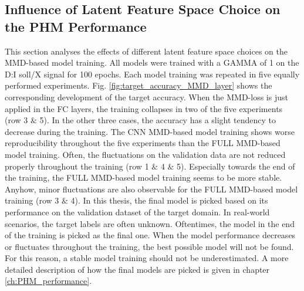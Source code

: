 \subsection{Influence of Latent Feature Space Choice on the PHM Performance}\label{ch:Influence_Layer_real_dataset}
This section analyses the effects of different latent feature space choices on the MMD-based model training. All models were trained with a GAMMA of 1 on the D:I soll/X signal for 100 epochs. Each model training was repeated in five equally performed experiments. Fig. \ref{fig:target_accuracy_MMD_layer} shows the corresponding development of the target accuracy. When the MMD-loss is just applied in the FC layers, the training collapses in two of the five experiments (row 3 $\&$ 5). In the other three cases, the accuracy has a slight tendency to decrease during the training. The CNN MMD-based model training shows worse reproducibility throughout the five experiments than the FULL MMD-based model training. Often, the fluctuations on the validation data are not reduced properly throughout the training (row 1 $\&$ 4 $\&$ 5). Especially towards the end of the training, the FULL MMD-based model training seems to be more stable. Anyhow, minor fluctuations are also observable for the FULL MMD-based model training (row 3 $\&$ 4). In this thesis, the final model is picked based on its performance on the validation dataset of the target domain. In real-world scenarios, the target labels are often unknown. Oftentimes, the model in the end of the training is picked as the final one. When the model performance decreases or fluctuates throughout the training, the best possible model will not be found. For this reason, a stable model training should not be underestimated. A more detailed description of how the final models are picked is given in chapter \ref{ch:PHM_performance}. 

